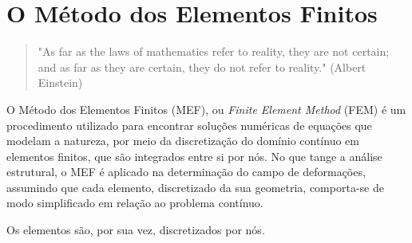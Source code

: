\chapter{O Método dos Elementos Finitos}

\begin{quote}
    "As far as the laws of mathematics refer to reality, they are not certain; and as far as they are certain, they do not refer to reality." (Albert Einstein)
\end{quote}

O Método dos Elementos Finitos (MEF), ou \textit{Finite Element Method} (FEM) é um procedimento utilizado para encontrar soluções numéricas de equações que modelam a natureza, por meio da discretização do domínio contínuo em elementos finitos, que são integrados entre si por nós. No que tange a análise estrutural, o MEF é aplicado na determinação do campo de deformações, assumindo que cada elemento, discretizado da sua geometria, comporta-se de modo simplificado em relação ao problema contínuo. \cite{LIU}

Os elementos são, por sua vez, discretizados por nós.